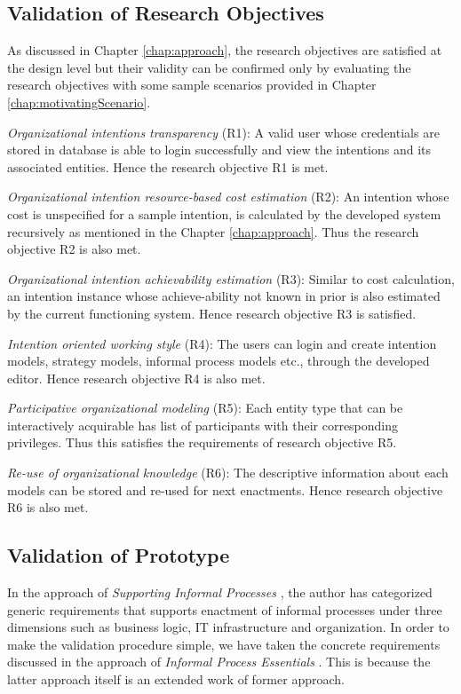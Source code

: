 \subsection{Validation of Research Objectives}
\label{subsec:validationofrequirements}
As discussed in Chapter \ref{chap:approach}, the research objectives are satisfied at the design level but their validity can be confirmed only by evaluating the research objectives with some sample scenarios provided in Chapter \ref{chap:motivatingScenario}.   

\textit{Organizational intentions transparency} (R1): A valid user whose credentials are stored in database is able to login successfully and view the intentions and its associated entities. Hence the research objective R1 is met.

\textit{Organizational intention resource-based cost estimation} (R2): An intention whose cost is unspecified for a sample intention, is calculated by the developed system recursively as mentioned in the Chapter \ref{chap:approach}. Thus the research objective R2 is also met.

\textit{Organizational intention achievability estimation} (R3): Similar to cost calculation, an intention instance whose achieve-ability not known in prior is also estimated by the current functioning system. Hence research objective R3 is satisfied.

\textit{Intention oriented working style} (R4): The users can login and create intention models, strategy models, informal process models etc., through the developed editor. Hence research objective R4 is also met.

\textit{Participative organizational modeling} (R5): Each entity type that can be interactively acquirable has list of participants with their corresponding privileges. Thus this satisfies the requirements of research objective R5.

\textit{Re-use of organizational knowledge} (R6): The descriptive information about each models can be stored and re-used for next enactments. Hence research objective R6 is also met.
	
\subsection{Validation of Prototype}
\label{subsec:validationofprototype}
In the approach of \textit{Supporting Informal Processes} \cite{Sungur2014}, the author has categorized generic requirements that supports enactment of informal processes under three dimensions such as business logic, IT infrastructure and organization. In order to make the validation procedure simple, we have taken the concrete requirements discussed in the approach of \textit{Informal Process Essentials} \cite{Sungur2014a}. This is because the latter approach itself is an extended work of former approach.  

